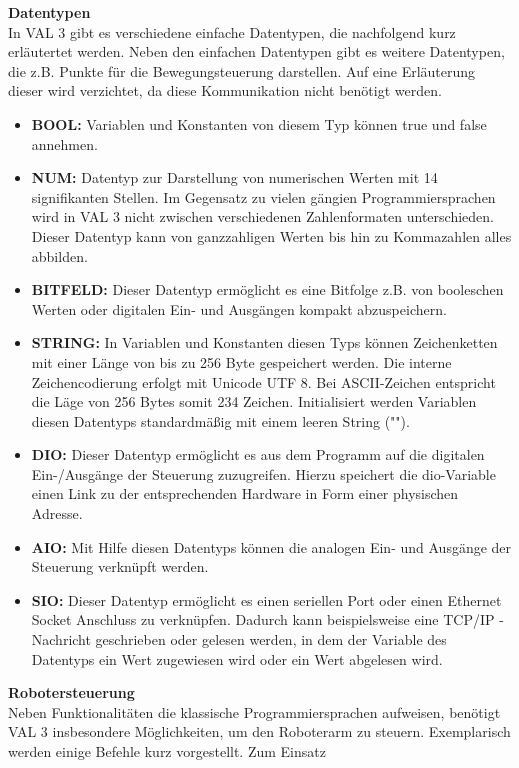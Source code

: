 \documentclass[ a4paper,
                oneside,
                toc=bibliography,
                toc=listof
                ]{scrbook}
\begin{document}
   	\textbf{Datentypen}\\
   	In VAL 3 gibt es verschiedene einfache Datentypen, die nachfolgend kurz erläutertet werden. Neben den einfachen Datentypen gibt es weitere Datentypen, die z.B. Punkte für die Bewegungsteuerung darstellen. Auf eine Erläuterung dieser wird verzichtet, da diese Kommunikation nicht benötigt werden.
   	\begin{itemize}
   		\item \textbf{BOOL:} Variablen und Konstanten von diesem Typ können true und false annehmen.
   		\item \textbf{NUM:} Datentyp zur Darstellung von numerischen Werten mit 14 signifikanten Stellen. Im Gegensatz zu vielen gängien Programmiersprachen wird in VAL 3 nicht zwischen verschiedenen Zahlenformaten unterschieden. Dieser Datentyp kann von ganzzahligen Werten bis hin zu Kommazahlen alles abbilden.
   		\item \textbf{BITFELD:} Dieser Datentyp ermöglicht es eine Bitfolge z.B. von booleschen Werten oder digitalen Ein- und Ausgängen kompakt abzuspeichern.
   		\item \textbf{STRING:} In Variablen und Konstanten diesen Typs können Zeichenketten mit einer Länge von bis zu 256 Byte gespeichert werden. Die interne Zeichencodierung erfolgt mit Unicode UTF 8. Bei ASCII-Zeichen entspricht die Läge von 256 Bytes somit 234 Zeichen. Initialisiert werden Variablen diesen Datentyps standardmäßig mit einem leeren String ("").
   		\item \textbf{DIO:} Dieser Datentyp ermöglicht es aus dem Programm auf die digitalen Ein-/Ausgänge der Steuerung zuzugreifen. Hierzu speichert die dio-Variable einen Link zu der entsprechenden Hardware in Form einer physischen Adresse.
   		\item \textbf{AIO:} Mit Hilfe diesen Datentyps können die analogen Ein- und Ausgänge der Steuerung verknüpft werden.
   		\item \textbf{SIO:} Dieser Datentyp ermöglicht es einen seriellen Port oder einen Ethernet Socket Anschluss zu verknüpfen. Dadurch kann beispielsweise eine TCP/IP - Nachricht geschrieben oder gelesen werden, in dem der Variable des Datentyps ein Wert zugewiesen wird oder ein Wert abgelesen wird. \\
   	\end{itemize}
   	\textbf{Robotersteuerung}\\
   	Neben Funktionalitäten die klassische Programmiersprachen aufweisen, benötigt VAL 3 insbesondere Möglichkeiten, um den Roboterarm zu steuern. Exemplarisch werden einige Befehle kurz vorgestellt. Zum Einsatz
\end{document}
